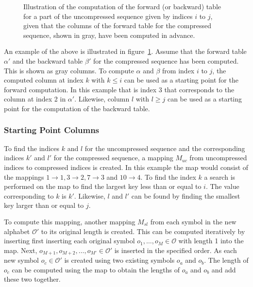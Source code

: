 \begin{figure}
  \centering
  
  \caption{Illustration of the computation of the forward (or backward) table
    for a part of the uncompressed sequence given by indices $i$ to $j$,
    given that the columns of the forward table for the compressed sequence,
    shown in gray, have been computed in advance.}
  \label{fig:subsequence-posterior}
\end{figure}

An example of the above is illustrated in
figure~\ref{fig:subsequence-posterior}. Assume that the forward table $\alpha'$
and the backward table $\beta'$ for the compressed sequence has been computed.
This is shown as gray columns. To compute $\alpha$ and $\beta$ from index $i$
to $j$, the computed column at index $k$ with $k \le i$ can be used as a
starting point for the forward computation. In this example that is index 3
that corresponds to the column at index 2 in $\alpha'$. Likewise, column
$l$ with $l \ge j$ can be used as a starting point for the
computation of the backward table.

\subsubsection{Starting Point Columns}

To find the indices $k$ and $l$ for the uncompressed sequence and the
corresponding indices $k'$ and $l'$ for the compressed sequence, a
mapping $M_{uc}$ from uncompressed indices to
compressed indices is created. In this example the map would consist of the
mappings $1 \rightarrow 1, 3 \rightarrow 2, 7 \rightarrow 3$ and
$10 \rightarrow 4$. To find the index $k$ a search is performed on the
map to find the largest key less than or equal to $i$. The value corresponding
to $k$ is $k'$. Likewise, $l$ and $l'$ can be found by finding the smallest key
larger than or equal to $j$.

To compute this mapping, another mapping $M_{sl}$ from each
symbol in the new alphabet $\mathcal{O'}$ to its original length is
created. This can be computed iteratively by inserting first inserting each
original symbol $o_1, \dots, o_M \in \mathcal{O}$ with length 1 into the
map. Next, $o_{M+1}, o_{M+2}, \dots, o_{M'} \in \mathcal{O'}$ is inserted in
the specified order. As each new symbol $o_c \in \mathcal{O'}$ is created using
two existing symbols $o_a$ and $o_b$. The length of $o_c$ can be computed
using the map to obtain the lengths of $o_a$ and $o_b$ and add these two
together.

